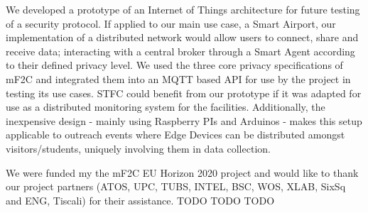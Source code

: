 We developed a prototype of an Internet of Things architecture for future testing of a security protocol. If applied to our main use case, a Smart Airport, our implementation of a distributed network would allow users to connect, share and receive data; interacting with a central broker through a Smart Agent according to their defined privacy level. We used the three core privacy specifications of mF2C and integrated them into an MQTT based API for use by the project in testing its use cases. STFC could benefit from our prototype if it was adapted for use as a distributed monitoring system for the facilities. Additionally, the inexpensive design - mainly using Raspberry PIs and Arduinos - makes this setup applicable to outreach events where Edge Devices can be distributed amongst visitors/students, uniquely involving them in data collection.

We were funded my the mF2C EU Horizon 2020 project and would like to thank our project partners (ATOS, UPC, TUBS, INTEL, BSC, WOS, XLAB, SixSq and ENG, Tiscali) for their assistance. TODO TODO TODO
